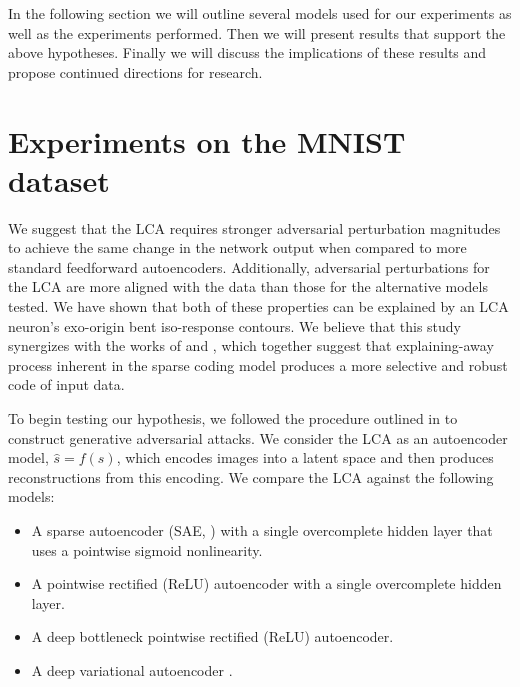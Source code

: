 In the following section we will outline several models used for our experiments as well as the experiments performed. Then we will present results that support the above hypotheses. Finally we will discuss the implications of these results and propose continued directions for research.


\section{Experiments on the MNIST dataset}\label{sec:ch4_mnist_experiments}
We suggest that the LCA requires stronger adversarial perturbation magnitudes to achieve the same change in the network output when compared to more standard feedforward autoencoders. Additionally, adversarial perturbations for the LCA are more aligned with the data than those for the alternative models tested. We have shown that both of these properties can be explained by an LCA neuron's exo-origin bent iso-response contours. We believe that this study synergizes with the works of \parencite{zhu2013visual} and \parencite{golden2016conjectures}, which together suggest that explaining-away process inherent in the sparse coding model produces a more selective and robust code of input data.

To begin testing our hypothesis, we followed the procedure outlined in \parencite{kos2018adversarial} to construct generative adversarial attacks. We consider the LCA as an autoencoder model, $\hat{s}=f(s)$, which encodes images into a latent space and then produces reconstructions from this encoding. We compare the LCA against the following models:

\begin{itemize}
  \item A sparse autoencoder (SAE, \parencite{ng2011sparse}) with a single overcomplete hidden layer that uses a pointwise sigmoid nonlinearity.
  \item A pointwise rectified (ReLU) \parencite{hahnloser2000digital, nair2010rectified} autoencoder with a single overcomplete hidden layer.
  \item A deep bottleneck pointwise rectified (ReLU) autoencoder.
  \item A deep variational autoencoder \parencite{kingma2013auto}.
\end{itemize}

